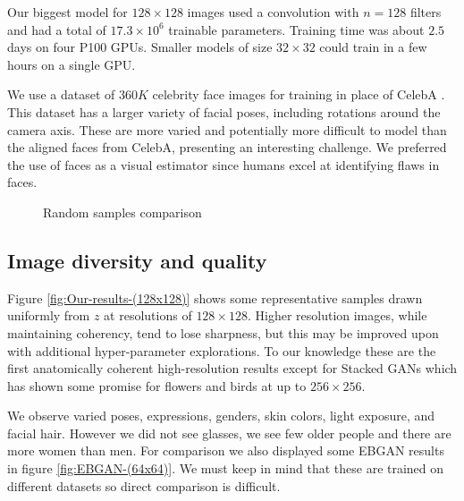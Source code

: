\documentclass[english]{article}
\begin{document}
Our biggest model for $128\times128$ images used a convolution with
$n=128$ filters and had a total of $17.3\times10^{6}$ trainable
parameters. Training time was about $2.5$ days on four P100 GPUs.
Smaller models of size $32\times32$ could train in a few hours on
a single GPU.

We use a dataset of $360K$ celebrity face images for training in
place of CelebA \cite{liu2015faceattributes_celeba}. This dataset
has a larger variety of facial poses, including rotations around the
camera axis. These are more varied and potentially more difficult
to model than the aligned faces from CelebA, presenting an interesting
challenge. We preferred the use of faces as a visual estimator since
humans excel at identifying flaws in faces.
\begin{figure}
\begin{centering}
\enskip{}
\par\end{centering}

\centering{}\caption{Random samples comparison \label{fig:rand}}
\end{figure}



\subsection{Image diversity and quality}

Figure \ref{fig:Our-results-(128x128)} shows some representative
samples drawn uniformly from $z$ at resolutions of $128\times128$.
Higher resolution images, while maintaining coherency, tend to lose
sharpness, but this may be improved upon with additional hyper-parameter
explorations. To our knowledge these are the first anatomically coherent
high-resolution results except for Stacked GANs \cite{zhang2016stackgan}
which has shown some promise for flowers and birds at up to $256\times256$. 

We observe varied poses, expressions, genders, skin colors, light
exposure, and facial hair. However we did not see glasses, we see
few older people and there are more women than men. For comparison
we also displayed some EBGAN \cite{zhao2016energy_ebgan} results
in figure \ref{fig:EBGAN-(64x64)}. We must keep in mind that these
are trained on different datasets so direct comparison is difficult.
\end{document}
